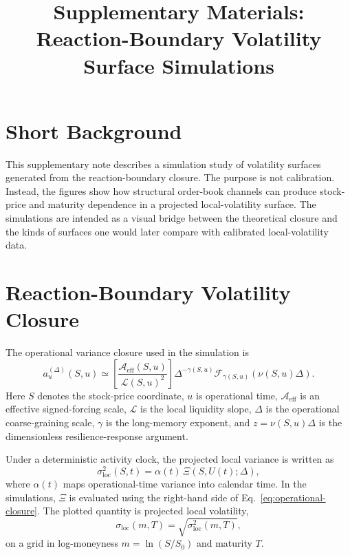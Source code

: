 \documentclass[11pt]{article}
\title{Supplementary Materials:\\Reaction-Boundary Volatility Surface Simulations}
\author{}
\date{}
\newcommand{\Aeff}{\mathcal A_{\mathrm{eff}}}
\newcommand{\Liq}{\mathcal L}
\newcommand{\Fresp}{\mathcal F}
\newcommand{\sigloc}{\sigma_{\mathrm{loc}}}
\begin{document}
\maketitle

\section{Short Background}

This supplementary note describes a simulation study of volatility surfaces
generated from the reaction-boundary closure. The purpose is not calibration.
Instead, the figures show how structural order-book channels can produce
stock-price and maturity dependence in a projected local-volatility surface.
The simulations are intended as a visual bridge between the theoretical
closure and the kinds of surfaces one would later compare with calibrated
local-volatility data.

\section{Reaction-Boundary Volatility Closure}

The operational variance closure used in the simulation is
\begin{equation}
 a_u^{(\Delta)}(S,u)
 \simeq
 \left[
 \frac{\Aeff(S,u)}
      {\Liq(S,u)^2}
 \right]
 \Delta^{-\gamma(S,u)}
 \Fresp_{\gamma(S,u)}\!\left(\nu(S,u)\Delta\right).
 \label{eq:operational-closure}
\end{equation}
Here \(S\) denotes the stock-price coordinate, \(u\) is operational time,
\(\Aeff\) is an effective signed-forcing scale, \(\Liq\) is the local
liquidity slope, \(\Delta\) is the operational coarse-graining scale,
\(\gamma\) is the long-memory exponent, and
\(z=\nu(S,u)\Delta\) is the dimensionless resilience-response argument.

Under a deterministic activity clock, the projected local variance is written
as
\begin{equation}
 \sigloc^2(S,t)
 =
 \alpha(t)\,
 \Xi(S,U(t);\Delta),
 \label{eq:projected-local-variance}
\end{equation}
where \(\alpha(t)\) maps operational-time variance into calendar time. In the
simulations, \(\Xi\) is evaluated using the right-hand side of
Eq.~\eqref{eq:operational-closure}. The plotted quantity is projected local
volatility,
\begin{equation}
 \sigloc(m,T)=\sqrt{\sigloc^2(m,T)},
 \label{eq:plotted-volatility}
\end{equation}
on a grid in log-moneyness \(m=\ln(S/S_0)\) and maturity \(T\).
\end{document}
